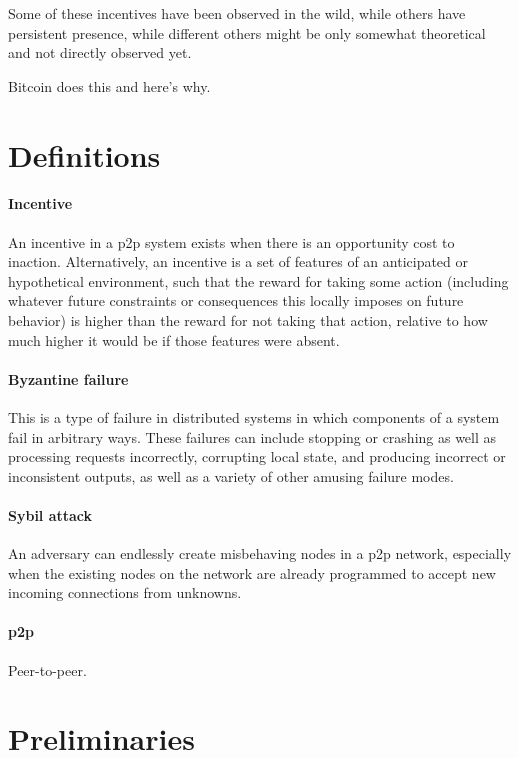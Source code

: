 \documentclass[letterpaper]{article}
\begin{document}
Some of these incentives have been observed in the wild, while others have
persistent presence, while different others might be only somewhat theoretical
and not directly observed yet.

Bitcoin does this and here's why.

\section{Definitions}

\paragraph{Incentive} An incentive in a p2p system exists when there is an
opportunity cost to inaction. Alternatively, an incentive is a set of features
of an anticipated or hypothetical environment, such that the reward for taking
some action (including whatever future constraints or consequences this locally
imposes on future behavior) is higher than the reward for not taking that
action, relative to how much higher it would be if those features were absent.

\paragraph{Byzantine failure} This is a type of failure in distributed systems
in which components of a system fail in arbitrary ways. These failures can
include stopping or crashing as well as processing requests incorrectly,
corrupting local state, and producing incorrect or inconsistent outputs, as
well as a variety of other amusing failure modes.

\paragraph{Sybil attack} An adversary can endlessly create misbehaving nodes in
a p2p network, especially when the existing nodes on the network are already
programmed to accept new incoming connections from unknowns.

\paragraph{p2p} Peer-to-peer.

\section{Preliminaries}
\end{document}
